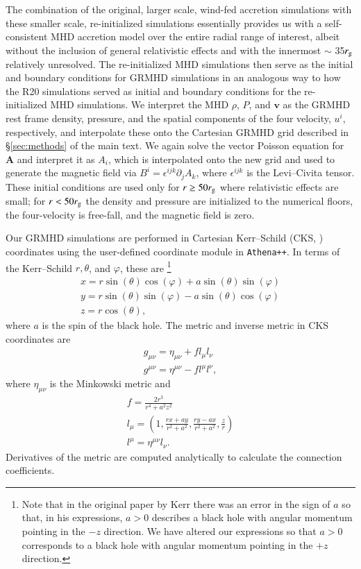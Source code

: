 \documentclass[twocolumn,twocolappendix,apjl,appendixfloats]{aastex63}
\begin{document}
The combination of the original, larger scale, wind-fed accretion simulations with these smaller scale, re-initialized simulations essentially provides us with a self-consistent MHD accretion model over the entire radial range of interest, albeit without the inclusion of general relativistic effects and with the innermost $\sim$ 35$r_{\rm g}$ relatively unresolved.   The re-initialized MHD simulations then serve as the initial and boundary conditions for GRMHD simulations in an analogous way to how the R20 simulations served as initial and boundary conditions for the re-initialized MHD simulations.   We interpret the MHD $\rho$, $P$, and $\mathbf{v}$ as the GRMHD rest frame density, pressure, and the spatial components of the four velocity, $u^i$, respectively, and interpolate these onto the Cartesian GRMHD grid described in \S \ref{sec:methods} of the main text.  We again solve the vector Poisson equation for $\mathbf{A}$ and interpret it as $A_i$, which is interpolated onto the new grid and used to generate the magnetic field via $B^i = \epsilon^{ijk}\partial_j A_k$, where $\epsilon^{ijk}$ is the Levi--Civita tensor.  These initial conditions are used only for $r\ge 50 r_{\rm g}$ where relativistic effects are small; for $r < 50 r_{\rm g}$ the density and pressure are initialized to the numerical floors, the four-velocity is free-fall, and the magnetic field is zero.  

Our GRMHD simulations are performed in Cartesian Kerr--Schild (CKS, \citealt{Kerr1963}) coordinates using the user-defined coordinate module in {\tt Athena++}. 
In terms of the Kerr--Schild $r,\theta$, and $\varphi$, these are \citep{Kerr1963}\footnote{Note that in the original paper by Kerr there was an error in the sign of $a$ \citep{Kerr2007} so that, in his expressions, $a>0$ describes a black hole with angular momentum pointing in the $-z$ direction.  We have altered our expressions so that $a>0$ corresponds to a black hole with angular momentum pointing in the $+z$ direction.  } 
\begin{eqnarray}
  x = r \sin(\theta) \cos(\varphi) + a\sin(\theta)\sin(\varphi) \\
  y = r \sin(\theta) \sin(\varphi) - a \sin(\theta)\cos(\varphi) \\
  z = r \cos(\theta),
\end{eqnarray}
where $a$ is the spin of the black hole.  The metric and inverse metric in CKS coordinates are
\begin{eqnarray} 
  g_{\mu \nu} = \eta_{\mu \nu} + f l_\mu l_\nu \\
  g^{\mu\nu} = \eta^{\mu \nu} - f l^\mu l^\nu,
\end{eqnarray}
where $\eta_{\mu \nu}$ is the Minkowski metric and 
\begin{eqnarray}
f = \frac{2r^3}{r^4 + a^2 z^2}\\
l_\mu = \left(1, \frac{rx+ay}{r^2+a^2}, \frac{ry-ax}{r^2+a^2},\frac{z}{r}\right) \\
l^\mu = \eta^{\mu\nu} l_\nu .
\end{eqnarray}   
Derivatives of the metric are computed analytically to calculate the connection coefficients.
\end{document}
